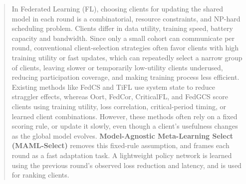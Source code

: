 \documentclass[journal]{IEEEtran}
\newcommand{\revision}[1]{#1}
\begin{document}
\begin{abstract}
\revision{In Federated Learning (FL), choosing clients for updating the shared model in each round is a combinatorial,  resource constraints, and NP-hard scheduling problem. Clients differ in data utility, training speed, battery capacity and bandwidth. Since only a small cohort can communicate per round, conventional client-selection strategies often favor clients with high training utility or fast updates, which  can repeatedly select a narrow group of clients, leaving slower or temporarily low-utility clients underused, reducing participation coverage, and making training process less efficient. Existing methods like FedCS and TiFL use system state to reduce straggler effects, whereas Oort, FedCor, CriticalFL, and FedGCS score clients using training utility, loss correlation, critical-period timing, or learned client combinations. However, these methods often rely on a fixed scoring rule, or update it slowly, even though a client’s usefulness changes as the global model evolves. \textbf{Model-Agnostic Meta-Learning Select (MAML-Select)} removes this fixed-rule assumption, and frames each round as a fast adaptation task. A lightweight policy network is learned using the previous round’s observed loss reduction and latency, and is used for ranking clients. %
}
\end{abstract}
\end{document}

